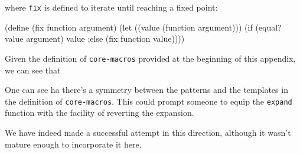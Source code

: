 where \texttt{fix} is defined to iterate until reaching a fixed point:

\begin{Snippet}
  (define (fix function argument)
    (let ((value (function argument)))
      (if (equal? value argument)
          value
      ;else
          (fix function value))))
\end{Snippet}

Given the definition of \texttt{core-macros} provided at the beginning
of this appendix, we can see that


One can see ha there's a symmetry between the patterns and the templates
in the definition of \texttt{core-macros}. This could prompt someone to
equip the \texttt{expand} function with the facility of reverting the
expansion.

We have indeed made a successful attempt in this direction, although it
wasn't mature enough to incorporate it here.
